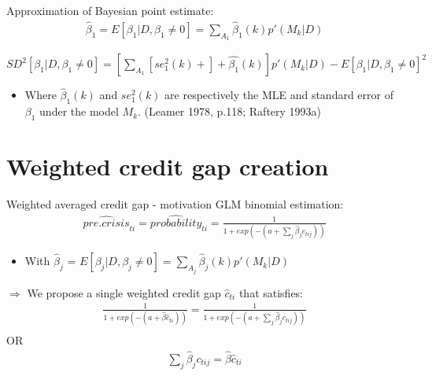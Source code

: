 \documentclass[
  ignorenonframetext,
]{beamer}
\providecommand{\tightlist}{%
  \setlength{\itemsep}{0pt}\setlength{\parskip}{0pt}}
\begin{document}
\begin{frame}{Approximation of Bayesian point estimate:}
\protect\hypertarget{approximation-of-bayesian-point-estimate}{}
\begin{align}
\hat{\beta}_1 = E[\beta_1|D, \beta_1\ne 0] = \sum\limits_{A_1} \hat{\beta}_1(k)p'(M_k|D)
\end{align}

\(SD^2[\beta_1|D, \beta_1\ne 0] =[\sum\limits_{A_1}[se_1^2(k)+]+\hat{\beta_1}(k)]p'(M_k|D) - E[\beta_1|D, \beta_1\ne 0]^2\)

\begin{itemize}
\tightlist
\item
  Where \(\hat{\beta}_1(k)\) and \(se_1^2(k)\) are respectively the MLE
  and standard error of \(\beta_1\) under the model \(M_k\). (Leamer
  1978, p.118; Raftery 1993a)
\end{itemize}
\end{frame}

\hypertarget{weighted-credit-gap-creation}{%
\section{Weighted credit gap
creation}\label{weighted-credit-gap-creation}}

\begin{frame}{Weighted averaged credit gap - motivation}
\protect\hypertarget{weighted-averaged-credit-gap---motivation}{}
GLM binomial estimation: \begin{align*}
\widehat{pre.crisis}_{ti} = \widehat{probability}_{ti} = \frac {1}{1+exp(-(a+\sum\nolimits_j \hat{\beta}_j c_{tij}))}
\end{align*}

\begin{itemize}
\tightlist
\item
  With \(\hat{\beta}_j\) =
  \(E[\beta_j|D, \beta_j\ne 0] = \sum\limits_{A_j} \hat{\beta}_j(k)p'(M_k|D)\)
\end{itemize}

\(\Rightarrow\) We propose a single weighted credit gap \(\hat{c}_{ti}\)
that satisfies: \begin{align*}
\frac {1}{1+exp(-(a+\hat{\beta} \hat{c}_{ti}))}= \frac {1}{1+exp(-(a+\sum\nolimits_j \hat{\beta}_j c_{tij}))} \\
\end{align*} OR \begin{align}
\sum\limits_j \hat{\beta}_j c_{tij} = \hat{\beta} \hat{c}_{ti}
\end{align}
\end{frame}
\end{document}
